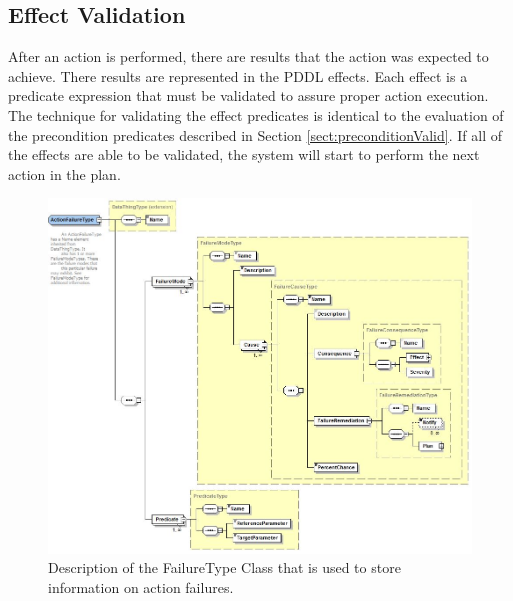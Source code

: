 \subsection{Effect Validation}
After an action is performed, there are results that the action was expected to 
achieve. There results are represented in the PDDL effects. Each effect is a predicate expression that must be validated to assure proper
action execution. The technique for validating the effect predicates is identical
to the evaluation of the precondition predicates described in Section \ref{sect:preconditionValid}. If all of the effects are able to be validated, the
system will start to perform the next action in the plan.
%
\begin{figure}[htb!]
\begin{center}
\includegraphics[width=12cm]{images/FailureType.jpg}
\caption{Description of the FailureType Class that is used to store information on action failures.}
\label{fig:failure}
\end{center}
\end{figure}
%